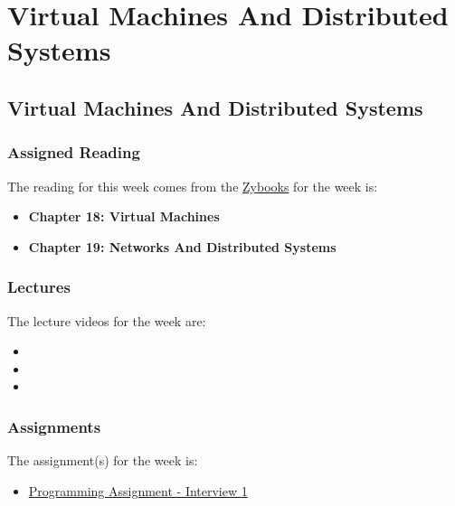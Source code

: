 \clearpage

\renewcommand{\ChapTitle}{Virtual Machines And Distributed Systems}
\renewcommand{\SectionTitle}{Virtual Machines And Distributed Systems}

\chapter{\ChapTitle}
\section{\SectionTitle}

\subsection{Assigned Reading}

The reading for this week comes from the \href{https://learn.zybooks.com/zybook/COLORADOCSPB3753KnoxFall2024}{Zybooks} for the week is:

\begin{itemize}
    \item \textbf{Chapter 18: Virtual Machines}
    \item \textbf{Chapter 19: Networks And Distributed Systems}
\end{itemize}

\subsection{Lectures}

The lecture videos for the week are:

\begin{itemize}
    \item {}
    \item {}
    \item {}
\end{itemize}

\subsection{Assignments}

The assignment(s) for the week is:

\begin{itemize}
    \item \href{https://applied.cs.colorado.edu/mod/scheduler/view.php?id=64572}{Programming Assignment - Interview 1}
\end{itemize}

